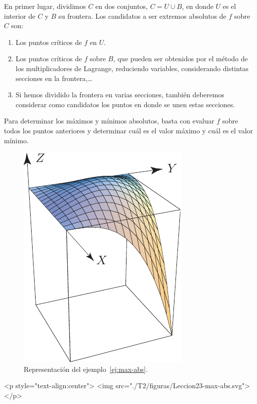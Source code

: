En primer lugar, dividimos $C$ en dos conjuntos,
$C=U\cup B$, en donde $U$ es el interior de $C$ y $B$ su frontera.
Los candidatos a ser extremos absolutos de $f$ sobre $C$ son:
\begin{enumerate}
\item
Los puntos críticos de $f$ en $U$.%
\item
Los puntos críticos de $f$ sobre $B$, que pueden ser obtenidos por el método de los multiplicadores de Lagrange, reduciendo variables, considerando distintas secciones en la frontera,\dots
\item
Si hemos dividido la frontera en varias secciones, también deberemos considerar como candidatos los puntos en donde se unen estas secciones.
\end{enumerate}
%
Para determinar los máximos y mínimos absolutos, basta con evaluar $f$ sobre todos los puntos anteriores y determinar cuál es el valor máximo y cuál es el valor mínimo.
%
\begin{figure}
\begin{center}
\includegraphics[scale=.6]{T2/figs/max-abs.pdf}
\end{center}
\caption{Representación del ejemplo~\ref{ej:max-abs}.}
\label{fig:max-abs}
\end{figure}
\begin{rawhtml}
<p style="text-align:center">
    <img src="./T2/figuras/Leccion23-max-abs.svg"></p>
\end{rawhtml}
%
